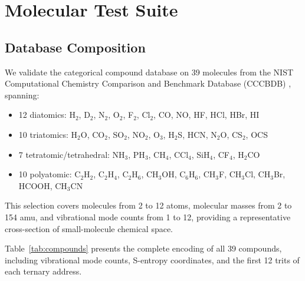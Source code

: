 \documentclass[11pt,twocolumn,a4paper]{article}
\theoremstyle{definition}
\theoremstyle{remark}
\begin{document}
\section{Molecular Test Suite}
\label{sec:test_suite}

\subsection{Database Composition}

We validate the categorical compound database on 39 molecules from the NIST Computational Chemistry Comparison and Benchmark Database (CCCBDB) \citep{johnson2022}, spanning:

\begin{itemize}[nosep]
\item 12 diatomics: H$_2$, D$_2$, N$_2$, O$_2$, F$_2$, Cl$_2$, CO, NO, HF, HCl, HBr, HI
\item 10 triatomics: H$_2$O, CO$_2$, SO$_2$, NO$_2$, O$_3$, H$_2$S, HCN, N$_2$O, CS$_2$, OCS
\item 7 tetratomic/tetrahedral: NH$_3$, PH$_3$, CH$_4$, CCl$_4$, SiH$_4$, CF$_4$, H$_2$CO
\item 10 polyatomic: C$_2$H$_2$, C$_2$H$_4$, C$_2$H$_6$, CH$_3$OH, C$_6$H$_6$, CH$_3$F, CH$_3$Cl, CH$_3$Br, HCOOH, CH$_3$CN
\end{itemize}

This selection covers molecules from 2 to 12 atoms, molecular masses from 2 to 154 amu, and vibrational mode counts from 1 to 12, providing a representative cross-section of small-molecule chemical space.

Table~\ref{tab:compounds} presents the complete encoding of all 39 compounds, including vibrational mode counts, S-entropy coordinates, and the first 12 trits of each ternary address.
\end{document}
